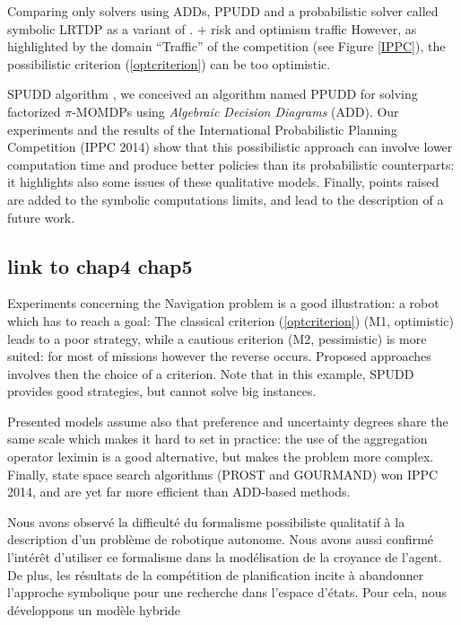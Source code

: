 Comparing only solvers using ADDs, 
PPUDD and a probabilistic solver called symbolic LRTDP 
as a variant of \cite{Bonet03labeledrtdp:}.
+ risk and optimism traffic
However, as highlighted by the domain ``Traffic''
of the competition (see Figure \ref{IPPC}), 
the possibilistic criterion (\ref{optcriterion})
can be too optimistic.

SPUDD algorithm \cite{Hoey99spudd:stochastic},
we conceived an algorithm named PPUDD \cite{DBLP:conf/aaai/DrougardTFD14} 
for solving factorized $\pi$-MOMDPs
using \textit{Algebraic Decision Diagrams} (ADD).
Our experiments and the  results 
of the International Probabilistic Planning Competition (IPPC 2014)
show that this possibilistic approach
can involve lower computation time
and produce better policies
than its probabilistic counterparts:
it highlights also some issues 
of these qualitative models.
Finally, points raised are added to 
the symbolic computations limits,
and lead to the description
of a future work.


\subsection*{link to chap4 chap5}
Experiments  
concerning the Navigation problem
is a good illustration: 
a robot which has to
reach a goal:
The classical criterion (\ref{optcriterion})
(M1, optimistic) 
leads to a poor strategy, 
while a cautious criterion (M2, pessimistic)
is more suited: 
for most of missions however 
the reverse occurs.
Proposed approaches involves then 
the choice of a criterion.
Note that in this example, 
SPUDD provides good strategies, but 
cannot solve big instances. 

Presented models 
assume also that preference
and uncertainty degrees
share the same scale
which makes it hard to
set in practice: the use of
the aggregation operator leximin 
is a good alternative,
but makes the problem more complex.
Finally, state space search algorithms
(PROST \cite{conf/aips/KellerE12} and GOURMAND) won IPPC 2014,
and are yet far more efficient than ADD-based methods.

Nous avons observ\'e la difficult\'e du formalisme possibiliste qualitatif \`a la
description d'un probl\`eme de robotique autonome. Nous avons aussi confirm\'e
l'int\'er\^et d'utiliser ce formalisme dans la mod\'elisation de la croyance de l'agent.
De plus, les r\'esultats de la comp\'etition de planification incite \`a abandonner l'approche symbolique pour
une recherche dans l'espace d'\'etats. Pour cela, nous d\'eveloppons un mod\`ele hybride

